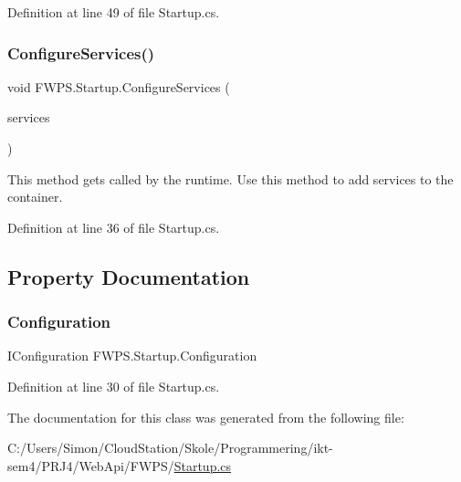 Definition at line 49 of file Startup.\+cs.

\mbox{\label{class_f_w_p_s_1_1_startup_ae36d133d440c4c5d79e4661c3b971f3e}} 
\subsubsection{\texorpdfstring{Configure\+Services()}{ConfigureServices()}}
{\footnotesize\ttfamily void F\+W\+P\+S.\+Startup.\+Configure\+Services (\begin{DoxyParamCaption}\item[{I\+Service\+Collection}]{services }\end{DoxyParamCaption})}



This method gets called by the runtime. Use this method to add services to the container. 



Definition at line 36 of file Startup.\+cs.



\subsection{Property Documentation}
\mbox{\label{class_f_w_p_s_1_1_startup_af083878e6522dc850f64df1e9d489e09}} 
\subsubsection{\texorpdfstring{Configuration}{Configuration}}
{\footnotesize\ttfamily I\+Configuration F\+W\+P\+S.\+Startup.\+Configuration\hspace{0.3cm}{\ttfamily [get]}}



Definition at line 30 of file Startup.\+cs.



The documentation for this class was generated from the following file\+:\begin{DoxyCompactItemize}
\item 
C\+:/\+Users/\+Simon/\+Cloud\+Station/\+Skole/\+Programmering/ikt-\/sem4/\+P\+R\+J4/\+Web\+Api/\+F\+W\+P\+S/\mbox{\hyperlink{_startup_8cs}{Startup.\+cs}}\end{DoxyCompactItemize}
